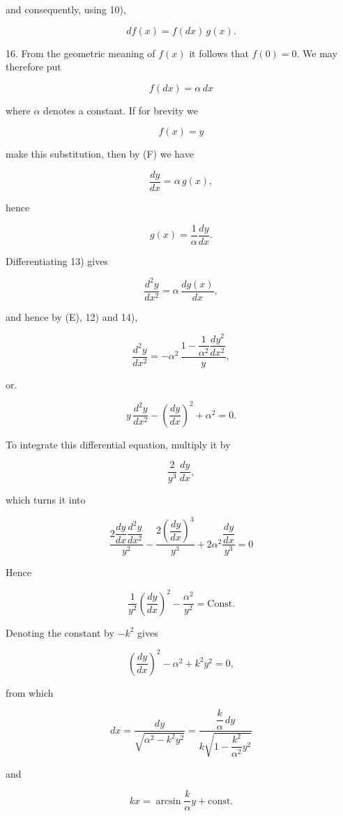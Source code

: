 %
\noindent and consequently, using 10),

\[
\tag*{(F)} df(x) = f(dx)\, g(x).
\]

16. From the geometric meaning of $f(x)$ it follows that $f(0) = 0$. We may therefore put

\[
\tag*{12)} f(dx) = \alpha\, dx
\]

where $\alpha$ denotes a constant. If for brevity we

\[
f(x) = y
\]

\noindent make this substitution, then by (F) we have

\[
\tag*{13)} \frac{dy}{dx} = \alpha\, g(x),
\]

hence

\[
\tag*{14)} g(x) = \frac{1}{\alpha}\frac{dy}{dx}.
\]

Differentiating 13) gives

\[
\frac{d^2y}{dx^2} = \alpha\, \frac{dg(x)}{dx},
\]

and hence by (E), 12) and 14),

\[
\frac{d^2y}{dx^2} = -\alpha^2\, \frac{1 - \dfrac{1}{\alpha^2}\dfrac{dy^2}{dx^2}}{y},
\]

or.

\[
\tag*{15)} y\, \frac{d^2y}{dx^2} - \left(\frac{dy}{dx}\right)^2 + \alpha^2 = 0.
\]

To integrate this differential equation, multiply it by

\[
\frac{2}{y^3}\, \frac{dy}{dx},
\]

which turns it into

\[
\frac{2\dfrac{dy}{dx}\dfrac{d^2y}{dx^2}}{y^2} - \frac{2\left(\dfrac{dy}{dx}\right)^3}{y^3} + 2\alpha^2\frac{\dfrac{dy}{dx}}{y^3} = 0
\]

Hence

\[
\frac{1}{y^2}\left(\frac{dy}{dx}\right)^2 - \frac{\alpha^2}{y^2} = \text{Const.}
\]

Denoting the constant by $-k^2$ gives

\[
\left(\frac{dy}{dx}\right)^2 - \alpha^2 + k^2 y^2 = 0,
\]

\noindent from which

\[
dx = \frac{dy}{\sqrt{\alpha^2 - k^2 y^2}} = \frac{\dfrac{k}{\alpha}\, dy}{k\sqrt{1 - \dfrac{k^2}{\alpha^2} y^2}}
\]

and

\[
kx = \arcsin \frac{k}{\alpha} y + \text{const.}
\]
